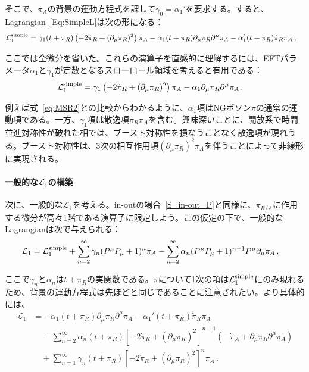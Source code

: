 そこで、$\pi_A$の背景の運動方程式を課して$\gamma_0=\alpha_1'$を要求する。すると、Lagrangian~\eqref{Eq:SimpleL}は次の形になる：
\begin{align}
\mathcal{L}_1^{\rm simple}
&=
\gamma_1(t+\pi_R)\left(-2\dot{\pi}_R+(\partial_\mu\pi_R)^2\right)\pi_A
-\alpha_1(t+\pi_R)\partial_\mu\pi_R\partial^\mu\pi_A
-\alpha_1'(t+\pi_R)\dot{\pi}_R\pi_A\,,
\end{align}

ここでは全微分を省いた。これらの演算子を直感的に理解するには、EFTパラメータ$\alpha_1$と$\gamma_1$が定数となるスローロール領域を考えると有用である：
\begin{align}
\mathcal{L}_1^{\rm simple}
&=
\gamma_1\left(-2\dot{\pi}_R+(\partial_\mu\pi_R)^2\right)\pi_A
-\alpha_1\partial_\mu\pi_R\partial^\mu\pi_A\,.
\end{align}

例えば式~\eqref{eq:MSR2}との比較からわかるように、$\alpha_1$項はNGボソン$\pi$の通常の運動項である。一方、$\gamma_1$項は散逸項$\dot{\pi}_R\pi_A$を含む。興味深いことに、開放系で時間並進対称性が破れた相では、ブースト対称性を損なうことなく散逸項が現れうる。ブースト対称性は、3次の相互作用項$(\partial_\mu\pi_R)^2\pi_A$を伴うことによって非線形に実現される。

\paragraph{一般的な$\mathcal{L}_1$の構築}

次に、一般的な$\mathcal{L}_1$を考える。in-outの場合~\eqref{S_in-out_P}と同様に、$\pi_{R/A}$に作用する微分が高々1階である演算子に限定しよう。この仮定の下で、一般的なLagrangianは次で与えられる：
\begin{align}
\mathcal{L}_1&=
\mathcal{L}_1^{\rm simple}+\sum_{n=2}^\infty\gamma_n(P^\mu P_\mu+1)^n\pi_A
-\sum_{n=2}^\infty\alpha_n(P^\mu P_\mu+1)^{n-1}P^\mu\partial_\mu\pi_A\,,
\end{align}

ここで$\gamma_n$と$\alpha_n$は$t+\pi_R$の実関数である。$\pi$について1次の項は$\mathcal{L}_1^{\rm simple}$にのみ現れるため、背景の運動方程式は先ほどと同じであることに注意されたい。より具体的には、
\begin{align}
\nonumber
\mathcal{L}_1&=
-\alpha_1(t+\pi_R)\partial_\mu\pi_R\partial^\mu\pi_A
-\alpha_1'(t+\pi_R)\dot{\pi}_R\pi_A
\\
\nonumber
&\quad
-\sum_{n=2}^\infty\alpha_n(t+\pi_R)\left[-2\dot{\pi}_R+(\partial_\mu\pi_R)^2\right]^{n-1}(-\dot{\pi}_A+\partial_\mu\pi_R\partial^\mu\pi_A)
\\
&\quad
+\sum_{n=1}^\infty\gamma_n(t+\pi_R)\left[-2\dot{\pi}_R+(\partial_\mu\pi_R)^2\right]^n\pi_A\,.
\label{EFTLag:pi_A1}
\end{align}

